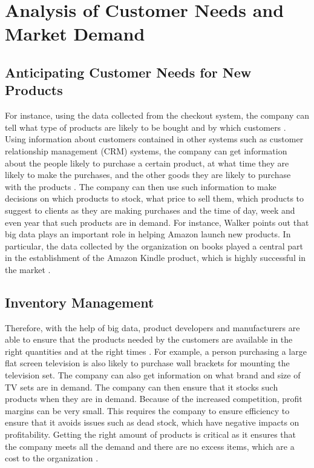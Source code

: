 \documentclass[sigconf]{acmart}
\begin{document}
\section{Analysis of Customer Needs and Market Demand}
\subsection{Anticipating Customer Needs for New Products}
For instance, using the data collected from the checkout system, the company can tell what type of products are likely to be bought and by which customers \cite{Walker2015}. Using information about customers contained in other systems such as customer relationship management (CRM) systems, the company can get information about the people likely to purchase a certain product, at what time they are likely to make the purchases, and the other goods they are likely to purchase with the products \cite{Walker2015}. The company can then use such information to make decisions on which products to stock, what price to sell them, which products to suggest to clients as they are making purchases and the time of day, week and even year that such products are in demand. For instance, Walker points out that big data plays an important role in helping Amazon launch new products. In particular, the data collected by the organization on books played a central part in the establishment of the Amazon Kindle product, which is highly successful in the market \cite{Walker2015}.
\subsection{Inventory Management}
Therefore, with the help of big data, product developers and manufacturers are able to ensure that the products needed by the customers are available in the right quantities and at the right times \cite{Davenport2014}. For example, a person purchasing a large flat screen television is also likely to purchase wall brackets for mounting the television set. The company can also get information on what brand and size of TV sets are in demand. The company can then ensure that it stocks such products when they are in demand. Because of the increased competition, profit margins can be very small. This requires the company to ensure efficiency to ensure that it avoids issues such as dead stock, which have negative impacts on profitability. Getting the right amount of products is critical as it ensures that the company meets all the demand and there are no excess items, which are a cost to the organization \cite{Provost2013}. 
\end{document}
